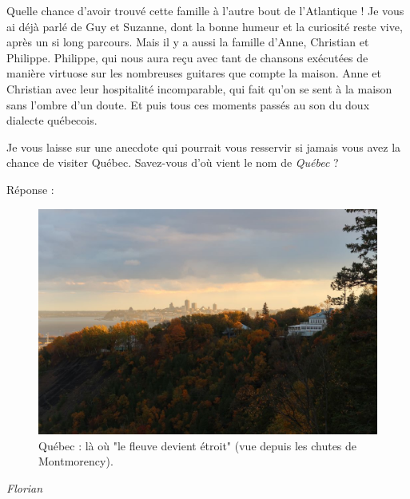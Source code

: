 Quelle chance d'avoir trouvé cette famille à l'autre bout de
l'Atlantique ! Je vous ai déjà parlé de Guy et Suzanne, dont la bonne
humeur et la curiosité reste vive, après un si long parcours. Mais il y
a aussi la famille d'Anne, Christian et Philippe. Philippe, qui nous
aura reçu avec tant de chansons exécutées de manière virtuose sur les
nombreuses guitares que compte la maison. Anne et Christian avec leur
hospitalité incomparable, qui fait qu'on se sent à la maison sans
l'ombre d'un doute. Et puis tous ces moments passés au son du doux
dialecte québecois.

Je vous laisse sur une anecdote qui pourrait vous resservir si jamais
vous avez la chance de visiter Québec. Savez-vous d'où vient le nom de
\emph{Québec} ?

Réponse :

\begin{figure}
\centering
\includegraphics{images/20181022_quebec.JPG}
\caption{Québec : là où "le fleuve devient étroit" (vue depuis les
chutes de Montmorency).}
\end{figure}

\emph{Florian}
